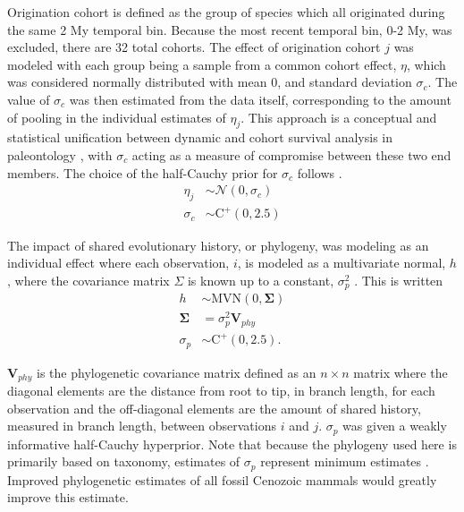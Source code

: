 \documentclass{pnastwo}
\begin{document}
\begin{article}
\begin{materials}
Origination cohort is defined as the group of species which all originated during the same 2 My temporal bin. Because the most recent temporal bin, 0-2 My, was excluded, there are 32 total cohorts. The effect of origination cohort \(j\) was modeled with each group being a sample from a common cohort effect, \(\eta\), which was considered normally distributed with mean 0, and standard deviation \(\sigma_{c}\). The value of \(\sigma_{c}\) was then estimated from the data itself, corresponding to the amount of pooling in the individual estimates of \(\eta_{j}\). This approach is a conceptual and statistical unification between dynamic and cohort survival analysis in paleontology \cite{Foote1988,Raup1978,Raup1975,VanValen1979,Baumiller1993}, with \(\sigma_{c}\) acting as a measure of compromise between these two end members. The choice of the half-Cauchy prior for \(\sigma_{c}\) follows \cite{Gelman2006a}.
\begin{align*}
  \eta_{j} &\sim \mathcal{N}(0, \sigma_{c}) \\
  \sigma_{c} &\sim \mathrm{C}^{+}(0, 2.5)
\end{align*}

The impact of shared evolutionary history, or phylogeny, was modeling as an individual effect where each observation, \(i\), is modeled as a multivariate normal, \(h\), where the covariance matrix \(\Sigma\) is known up to a constant, \(\sigma_{p}^{2}\) \cite{Lynch1991,Housworth2004}. This is written
\begin{align*}
  h &\sim \mathrm{MVN}(0, \mathbf{\Sigma}) \\
  \mathbf{\Sigma} &= \sigma_{p}^{2} \mathbf{V}_{phy} \\
  \sigma_{p} &\sim \mathrm{C}^{+}(0, 2.5).
\end{align*}

\(\mathbf{V}_{phy}\) is the phylogenetic covariance matrix defined as an \(n \times n\) matrix where the diagonal elements are the distance from root to tip, in branch length, for each observation and the off-diagonal elements are the amount of shared history, measured in branch length, between observations \(i\) and \(j\). \(\sigma_{p}\) was given a weakly informative half-Cauchy hyperprior. Note that because the phylogeny used here is primarily based on taxonomy, estimates of \(\sigma_{p}\) represent minimum estimates \cite{Lynch1991,Housworth2004}. Improved phylogenetic estimates of all fossil Cenozoic mammals would greatly improve this estimate.


\end{materials}
\end{article}
\end{document}
